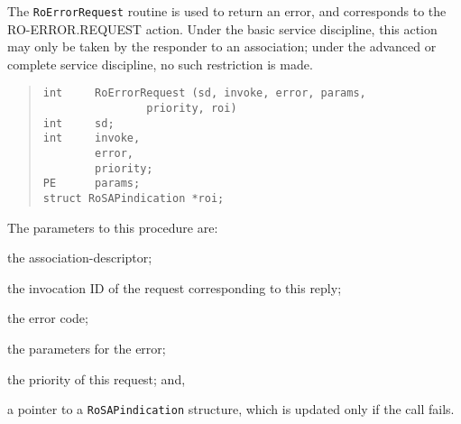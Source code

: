 The \verb"RoErrorRequest" routine is used to return an error,
and corresponds to the {\sf RO-ERROR.REQUEST\/} action.
Under the basic service discipline,
this action may only be taken by the responder to an association;
under the advanced or complete service discipline,
no such restriction is made.
\begin{quote}\small\begin{verbatim}
int     RoErrorRequest (sd, invoke, error, params,
                priority, roi)
int     sd;
int     invoke,
        error,
        priority;
PE      params;
struct RoSAPindication *roi;
\end{verbatim}\end{quote}
The parameters to this procedure are:
\begin{describe}
\item[\verb"sd":] the association-descriptor;

\item[\verb"invoke":] the invocation ID of the request corresponding to this
reply;

\item[\verb"op":] the error code;

\item[\verb"params":] the parameters for the error;

\item[\verb"priority":] the priority of this request;
and,

\item[\verb"roi":] a pointer to a \verb"RoSAPindication" structure, which is
updated only if the call fails.
\end{describe}

